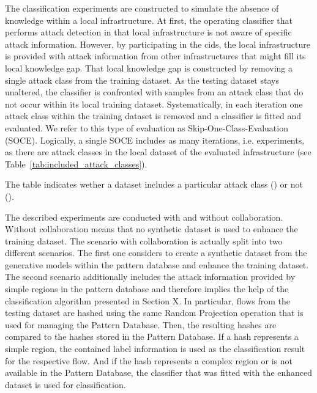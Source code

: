 \documentclass[../../main.tex]{subfiles}
\begin{document}
The classification experiments are constructed to simulate the absence of knowledge within a local infrastructure. At first, the operating classifier that performs attack detection in that local infrastructure is not aware of specific attack information. However, by participating in the \gls{cids}, the local infrastructure is provided with attack information from other infrastructures that might fill its local knowledge gap. That local knowledge gap is constructed by removing a single attack class from the training dataset. As the testing dataset stays unaltered, the classifier is confronted with samples from an attack class that do not occur within its local training dataset. Systematically, in each iteration one attack class within the training dataset is removed and a classifier is fitted and evaluated. We refer to this type of evaluation as Skip-One-Class-Evaluation (SOCE). Logically, a single SOCE includes as many iterations, i.e. experiments, as there are attack classes in the local dataset of the evaluated infrastructure (see Table~\ref{tab:included_attack_classes}).

\begin{table}[H]
    \footnotesize
    \centering
    \setlength{\extrarowheight}{0pt}
    \addtolength{\extrarowheight}{\aboverulesep}
    \addtolength{\extrarowheight}{\belowrulesep}
    \setlength{\aboverulesep}{0pt}
    \setlength{\belowrulesep}{0pt}
    \setlength{\extrarowheight}{.1em}
     
    \caption[Attack Classes Included in the Datasets]{The table indicates wether a dataset includes a particular attack class (\cmark) or not (\xmark).}
    \label{tab:included_attack_classes}
\end{table}

The described experiments are conducted with and without collaboration. Without collaboration means that no synthetic dataset is used to enhance the training dataset. The scenario with collaboration is actually split into two different scenarios. The first one considers to create a synthetic dataset from the generative models within the pattern database and enhance the training dataset. The second scenario additionally includes the attack information provided by simple regions in the pattern database and therefore implies the help of the classification algorithm presented in Section X. In particular, flows from the testing dataset are hashed using the same Random Projection operation that is used for managing the Pattern Database. Then, the resulting hashes are compared to the hashes stored in the Pattern Database. If a hash represents a simple region, the contained label information is used as the classification result for the respective flow. And if the hash represents a complex region or is not available in the Pattern Database, the classifier that was fitted with the enhanced dataset is used for classification. 
\end{document}
